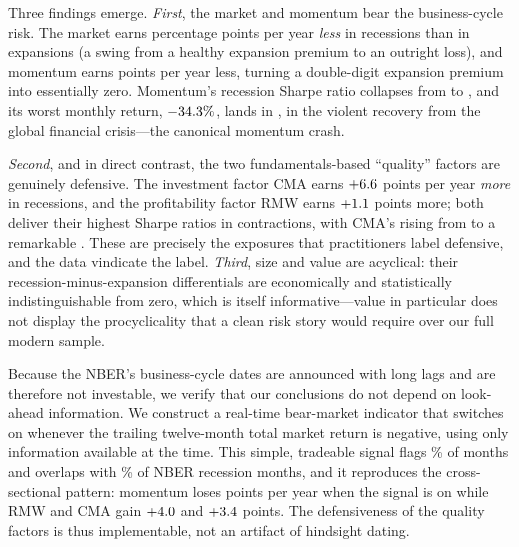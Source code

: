 \documentclass[12pt]{article}
\begin{document}
Three findings emerge. \emph{First}, the market and momentum bear the
business-cycle risk. The market earns \mktRecDiff{} percentage points per year
\emph{less} in recessions than in expansions (a swing from a healthy expansion
premium to an outright loss), and momentum earns \momRecDiff{} points per year
less, turning a double-digit expansion premium into essentially zero. Momentum's
recession Sharpe ratio collapses from \momSharpeE{} to \momSharpeR, and its
worst monthly return, $-34.3\%$, lands in \momWorstDate, in the violent
recovery from the global financial crisis---the canonical momentum crash.

\emph{Second}, and in direct contrast, the two fundamentals-based ``quality''
factors are genuinely defensive. The investment factor CMA earns
$+6.6$ points per year \emph{more} in recessions, and the profitability
factor RMW earns $+1.1$ points more; both deliver their highest Sharpe
ratios in contractions, with CMA's rising from \cmaSharpeE{} to a remarkable
\cmaSharpeR. These are precisely the exposures that practitioners label
defensive, and the data vindicate the label. \emph{Third}, size and value are
acyclical: their recession-minus-expansion differentials are economically and
statistically indistinguishable from zero, which is itself informative---value
in particular does not display the procyclicality that a clean risk story
would require over our full modern sample.

Because the NBER's business-cycle dates are announced with long lags and are
therefore not investable, we verify that our conclusions do not depend on
look-ahead information. We construct a real-time bear-market indicator that
switches on whenever the trailing twelve-month total market return is negative,
using only information available at the time. This simple, tradeable signal
flags \bearFrac\% of months and overlaps with \bearOverlap\% of NBER recession
months, and it reproduces the cross-sectional pattern: momentum loses
\momBearDiff{} points per year when the signal is on while RMW and CMA gain
$+4.0$ and $+3.4$ points. The defensiveness of the quality
factors is thus implementable, not an artifact of hindsight dating.
\end{document}
